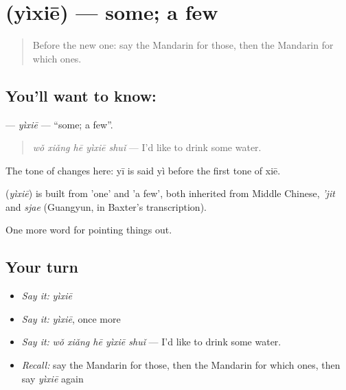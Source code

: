 \section[\texorpdfstring{\zh{一些} (yìxiē)}{一些 (yìxiē)}]{ (yìxiē) — some; a few}

\label{lesson:ZH-C127-yixie}



\begin{quote}
Before the new one: say the Mandarin for those, then the Mandarin for which ones.
\end{quote}

\subsection*{You'll want to know: }
\textbf{} — \emph{yìxiē} — \textquotedblleft{}some; a few\textquotedblright{}.

\begin{quote}
\textbf{} \emph{wǒ xiǎng hē yìxiē shuǐ} — I'd like to drink some water.
\end{quote}

The tone of  changes here: yī is said yì before the first tone of xiē.

\begin{cousinweb}
\textbf{} (\emph{yìxiē}) is built from  'one' and  'a few', both inherited from Middle Chinese, \emph{'jit} and \emph{sjae} (Guangyun, in Baxter's transcription).
\end{cousinweb}

\begin{grammarlens}[title={What you've built}]
One more word for pointing things out.
\end{grammarlens}

\subsection*{Your turn}
\begin{itemize}
\raggedright
  \item \emph{Say it:} \emph{yìxiē}
  \item \emph{Say it:} \emph{yìxiē}, once more
  \item \emph{Say it:} \emph{wǒ xiǎng hē yìxiē shuǐ} — I'd like to drink some water.
  \item \emph{Recall:} say the Mandarin for those, then the Mandarin for which ones, then say \emph{yìxiē} again
\end{itemize}

